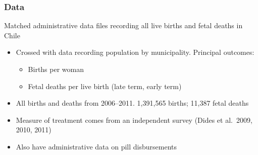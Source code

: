 \documentclass[10pt,letterpaper,subeqn]{beamer}
\begin{document}
\begin{frame}[label=sum]
\frametitle{Data}
Matched administrative data files recording all live births and fetal deaths in Chile
\vspace{5mm}
\begin{itemize}
\item Crossed with data recording population by municipality.  Principal outcomes:
\begin{itemize}
\item Births per woman
\item Fetal deaths per live birth (late term, early term)
\end{itemize}
\item All births and deaths from 2006--2011.  1,391,565 births; 11,387 fetal deaths
\item Measure of treatment comes from an independent survey (Dides et al.\ 2009, 2010, 2011)
\item Also have administrative data on pill disbursements
\end{itemize}
\hyperlink{sumR}{}  \hyperlink{datV}{}
\end{frame}




\end{document}
